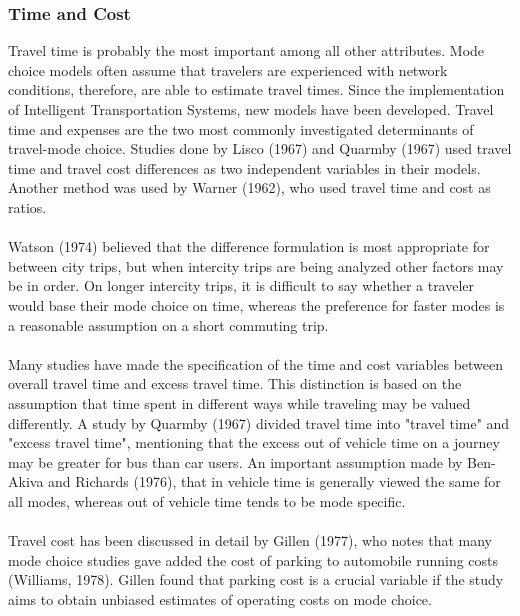 \subsubsection{Time and Cost}
Travel time is probably the most important among all other attributes. Mode choice models often assume that travelers are experienced with network conditions, therefore, are able to estimate travel times. Since the implementation of Intelligent Transportation Systems, new models have been developed.
Travel time and expenses are the two most commonly investigated determinants of travel-mode choice. Studies done by Lisco (1967) and Quarmby (1967) used travel time and travel cost differences as two independent variables in their models. Another method was used by Warner (1962), who used travel time and cost as ratios.
\paragraph{}Watson (1974) believed that the difference formulation is most appropriate for between city trips, but when intercity trips are being analyzed other factors may be in order. On longer intercity trips, it is difficult to say whether a traveler would base their mode choice on time, whereas the preference for faster modes is a reasonable assumption on a short commuting trip. 
\paragraph{}Many studies have made the specification of the time and cost variables between overall travel time and excess travel time. This distinction is based on the assumption that time spent in different ways while traveling may be valued differently. A study by Quarmby (1967) divided travel time into "travel time" and "excess travel time", mentioning that the excess out of vehicle time on a journey may be greater for bus than car users. An important assumption made by Ben-Akiva and Richards (1976), that in vehicle time is generally viewed the same for all modes, whereas out of vehicle time tends to be mode  specific. 
\paragraph{}Travel cost has been discussed in detail by Gillen (1977), who notes that many mode choice studies gave added the cost of parking to automobile running costs (Williams, 1978). Gillen found that parking cost is a  crucial variable if the study aims to obtain unbiased estimates of operating costs on mode choice. 

